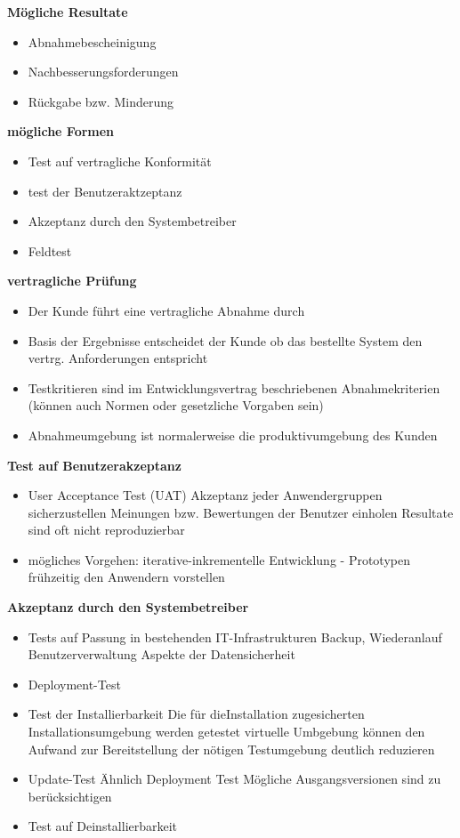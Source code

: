 \documentclass{report}
\theoremstyle{definition}
\theoremstyle{example}
\begin{document}
\textbf{Mögliche Resultate}
\begin{itemize}
   \item Abnahmebescheinigung
   \item Nachbesserungsforderungen
   \item Rückgabe bzw. Minderung
\end{itemize}

\textbf{mögliche Formen}
\begin{itemize}
   \item Test auf vertragliche Konformität
   \item test der Benutzeraktzeptanz
   \item Akzeptanz durch den Systembetreiber
   \item Feldtest
\end{itemize}

\textbf{vertragliche Prüfung}
\begin{itemize}
   \item Der Kunde führt eine vertragliche Abnahme durch
   \item Basis der Ergebnisse entscheidet der Kunde ob das bestellte System den vertrg. Anforderungen entspricht
   \item Testkritieren sind im Entwicklungsvertrag beschriebenen Abnahmekriterien (können auch Normen oder gesetzliche Vorgaben sein)
   \item Abnahmeumgebung ist normalerweise die produktivumgebung des Kunden
\end{itemize}

\textbf{Test auf Benutzerakzeptanz}
\begin{itemize}
   \item User Acceptance Test (UAT)
   \subitem Akzeptanz jeder Anwendergruppen sicherzustellen
   \subitem Meinungen bzw. Bewertungen der Benutzer einholen
   \subitem Resultate sind oft nicht reproduzierbar
   \item mögliches Vorgehen: iterative-inkrementelle Entwicklung - Prototypen frühzeitig den Anwendern vorstellen 
\end{itemize}

\textbf{Akzeptanz durch den Systembetreiber}
\begin{itemize}
   \item Tests auf Passung in bestehenden IT-Infrastrukturen
   \subitem Backup, Wiederanlauf
   \subitem Benutzerverwaltung
   \subitem Aspekte der Datensicherheit
   \item Deployment-Test
   \item Test der Installierbarkeit
   \subitem Die für dieInstallation zugesicherten Installationsumgebung werden getestet
   \subitem virtuelle Umbgebung können den Aufwand zur Bereitstellung der nötigen Testumgebung deutlich reduzieren
   \item Update-Test
   \subitem Ähnlich Deployment Test
   \subitem Mögliche Ausgangsversionen sind zu berücksichtigen
   \item Test auf Deinstallierbarkeit
\end{itemize}
\end{document}
